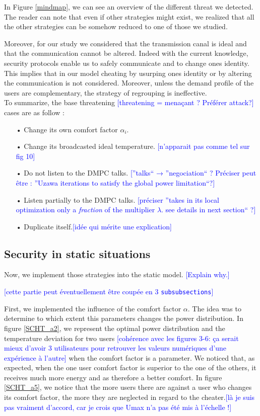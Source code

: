 \documentclass[conference]{IEEEtran}
\newcommand{\rem}[1]{\textcolor{blue}{[#1]}}
\begin{document}
In Figure \ref{mindmap}, we can see an overview of the different threat we detected. The reader can note that even if other strategies might exist, we realized  that all the other strategies can be somehow reduced to one of those we studied. 

Moreover, for our study we considered that the transmission canal is ideal and that the communication cannot be altered. Indeed with the current knowledge, security protocols enable us to safely communicate and to change ones identity. This implies that in our model cheating by usurping ones identity or by altering the communication is not considered. Moreover, unless the demand profile of the users are complementary, the strategy of regrouping is ineffective. \\

To summarize, the base threatening \rem{threatening = menaçant ? Préférer attack?} cases are as follow :
\begin{itemize}
\item[•] Change its own comfort factor $\alpha_i$.
\item[•] Change its broadcasted ideal temperature. \rem{n'apparait pas comme tel sur fig 10}
\item[•] Do not listen to the DMPC talks. \rem{''talks`` → ''negociation`` ? Préciser peut être : ''Uzawa iterations to satisfy the global power limitation``?}
\item[•] Listen partially to the DMPC talks. \rem{préciser ''takes in its local optimization only a \emph{fraction} of the multiplier $\lambda$. see details in next section`` ?}
\item[•] Duplicate itself.\rem{idée qui mérite une explication}
\end{itemize}

\subsection{Security in static situations}
Now, we implement those strategies into the static model. 
\rem{Explain why.}

\rem{cette partie peut éventuellement être coupée en 3 \texttt{subsubsections}}

First, we implemented the influence of the comfort factor $\alpha$. The idea was to determine to which extent this parameters changes the power distribution. In figure \ref{SCHT_a2}, we represent the optimal power distribution and the temperature deviation for two users \rem{cohérence avec les figures 3-6: ça serait mieux d'avoir 3 utilisateurs pour retrouver les valeurs numériques d'une expérience à l'autre} when the comfort factor is a parameter. We noticed that, as expected, when the one user comfort factor is superior to the one of the others,  it receives much more energy and as therefore a better comfort. In figure \ref{SCHT_a5}, we notice that the more users there are against a user who changes its comfort factor, the more they are neglected in regard to the cheater.\rem{là je suis pas vraiment d'accord, car je crois que Umax n'a pas été mis à l'échelle !}
\end{document}
